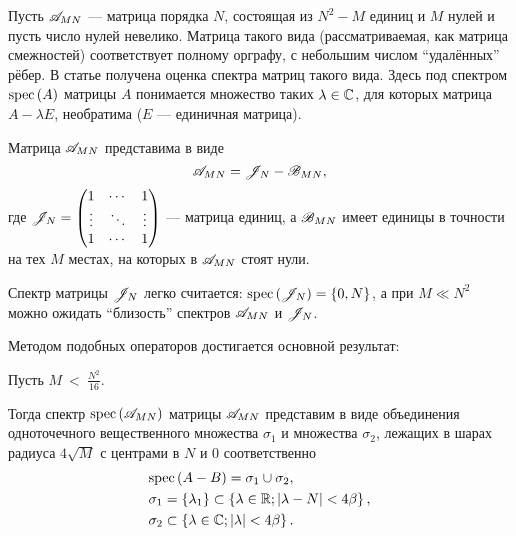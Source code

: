 Пусть \( \mathscr{A}_{{M}{N}} \) --- матрица порядка \( N \),
состоящая из \( N^2 - M \) единиц и \( M \) нулей
и пусть число нулей невелико.
Матрица такого вида (рассматриваемая, как матрица смежностей) соответствует
полному орграфу, с небольшим числом ``удалённых'' рёбер.
В статье получена оценка спектра
матриц такого вида.
Здесь под спектром \( \mathrm{spec}\left({A}\right) \) матрицы \( A \)
понимается множество таких \( \lambda\in\mathbb{C} \), для которых
матрица \( A - \lambda E \), необратима (\( E \) --- единичная матрица).

Матрица \( \mathscr{A}_{{M}{N}} \) представима в виде
\[
    \mathscr{A}_{{M}{N}} = \mathscr{J}_{N} - \mathscr{B}_{{M}{N}},
    \]
где \(
\mathscr{J}_{N} =
\begin{pmatrix}1 & \cdots & 1 \\
\vdots & \ddots & \vdots \\
1 & \cdots & 1
\end{pmatrix} \) --- матрица единиц,
а \( \mathscr{B}_{{M}{N}} \) имеет единицы в точности на тех \( M \)
местах, на которых в \( \mathscr{A}_{{M}{N}} \) стоят нули.

Спектр матрицы \( \mathscr{J}_{N} \) легко считается:
\( \mathrm{spec}\left({\mathscr{J}_{N}}\right) = \left\{0, N \right\} \),
а при \( M \ll N^2 \) можно ожидать ``близость'' спектров
\( \mathscr{A}_{{M}{N}} \) и \( \mathscr{J}_{N} \).

Методом подобных операторов \cite{baskakov-harmonic}
достигается основной результат:
\begin{thm}\label{thm:almostallones-spectra}
    Пусть
    \(M~<~\displaystyle{\frac{N^2}{16}}. \)

    Тогда спектр \( \mathrm{spec}\left({\mathscr{A}_{{M}{N}}}\right) \)
    матрицы \( \mathscr{A}_{{M}{N}} \)
    представим в виде объединения
    одноточечного вещественного множества \( \sigma_1 \)
    и множества \( \sigma_2 \),
    лежащих в шарах радиуса \( 4\sqrt{M} \)
    с центрами в \( N \) и \( 0 \) соответственно
    \begin{equation}\begin{aligned}
        & \mathrm{spec}\left({A-B}\right) = \sigma_1 \cup \sigma_2, \\
        & \sigma_1 = \left\{ \lambda_1 \right\}
          \subset \left\{ \lambda\in\mathbb{R}; \lvert \lambda - N\rvert < 4\beta \right\}, \\
        & \sigma_2 \subset \left\{\lambda\in\mathbb{C}; \lvert\lambda\rvert <4\beta \right\}. \\
    \end{aligned}\end{equation}
\end{thm}

